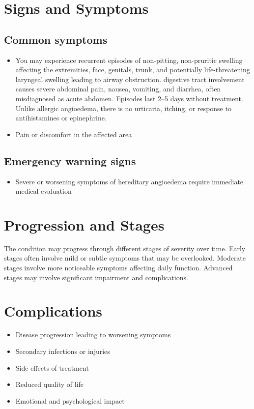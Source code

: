 \section{Signs and Symptoms}

\subsection{Common symptoms}
\begin{itemize}[noitemsep]
  \item You may experience recurrent episodes of non-pitting, non-pruritic swelling affecting the extremities, face, genitals, trunk, and potentially life-threatening laryngeal swelling leading to airway obstruction. digestive tract involvement causes severe abdominal pain, nausea, vomiting, and diarrhea, often misdiagnosed as acute abdomen. Episodes last 2--5 days without treatment. Unlike allergic angioedema, there is no urticaria, itching, or response to antihistamines or epinephrine.
  \item Pain or discomfort in the affected area
  \end{itemize}

\subsection{Emergency warning signs}
\begin{itemize}[noitemsep]
  \item Severe or worsening symptoms of hereditary angioedema require immediate medical evaluation
\end{itemize}
\section{Progression and Stages}
The condition may progress through different stages of severity over time. Early stages often involve mild or subtle symptoms that may be overlooked. Moderate stages involve more noticeable symptoms affecting daily function. Advanced stages may involve significant impairment and complications.
\section{Complications}
\begin{itemize}[noitemsep]
  \item Disease progression leading to worsening symptoms
  \item Secondary infections or injuries
  \item Side effects of treatment
  \item Reduced quality of life
  \item Emotional and psychological impact
\end{itemize}
